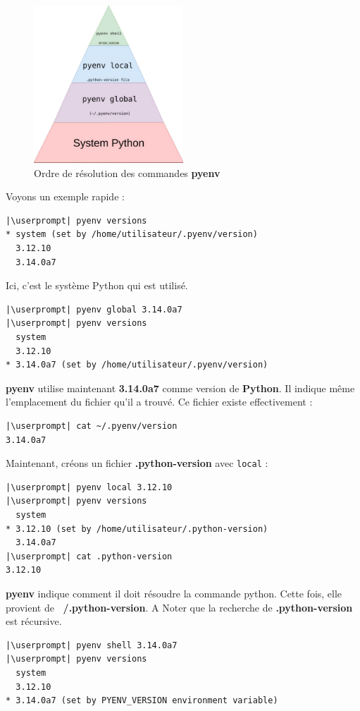 \begin{figure}[h!]
    \centering
    \includegraphics[width=0.5\textwidth]{IMG/pyenv.png} 
    \caption{Ordre de résolution des commandes \textbf{pyenv}}
\end{figure}

Voyons un exemple rapide :
\begin{lstlisting}[style=bash]
|\userprompt| pyenv versions
* system (set by /home/utilisateur/.pyenv/version)
  3.12.10
  3.14.0a7
\end{lstlisting}

Ici, c'est le système Python qui est utilisé.
\begin{lstlisting}[style=bash]
|\userprompt| pyenv global 3.14.0a7
|\userprompt| pyenv versions
  system
  3.12.10
* 3.14.0a7 (set by /home/utilisateur/.pyenv/version)
\end{lstlisting}

\textbf{pyenv} utilise maintenant \textbf{3.14.0a7} comme version de \textbf{Python}. Il indique même l'emplacement du fichier qu'il a trouvé. Ce fichier existe effectivement :
\begin{lstlisting}[style=bash]
|\userprompt| cat ~/.pyenv/version
3.14.0a7
\end{lstlisting}

Maintenant, créons un fichier \textbf{.python-version} avec \texttt{local} :
\begin{lstlisting}[style=bash]
|\userprompt| pyenv local 3.12.10
|\userprompt| pyenv versions
  system
* 3.12.10 (set by /home/utilisateur/.python-version)
  3.14.0a7
|\userprompt| cat .python-version
3.12.10
\end{lstlisting}

\textbf{pyenv} indique comment il doit résoudre la commande python. Cette fois, elle provient de \textbf{~/.python-version}. A Noter que la recherche de \textbf{.python-version} est récursive.
\begin{lstlisting}[style=bash]
|\userprompt| pyenv shell 3.14.0a7
|\userprompt| pyenv versions
  system
  3.12.10
* 3.14.0a7 (set by PYENV_VERSION environment variable)
\end{lstlisting}

